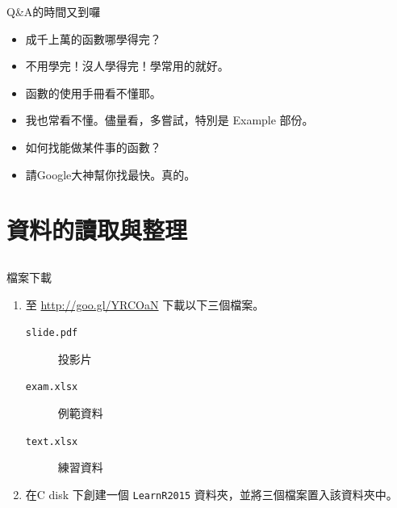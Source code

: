 \documentclass[12pt, aspectratio=43]{beamer}
\begin{document}
\begin{frame}[fragile]{Q\&A的時間又到囉}
\begin{itemize}
\item[Q] 成千上萬的函數哪學得完？
\item[A] 不用學完！沒人學得完！學常用的就好。
\end{itemize}
\begin{itemize}
\item[Q] 函數的使用手冊看不懂耶。
\item[A] 我也常看不懂。儘量看，多嘗試，特別是 Example 部份。
\end{itemize}
\begin{itemize}
\item[Q] 如何找能做某件事的函數？
\item[A] 請Google大神幫你找最快。真的。
\end{itemize}
\end{frame}


\section{資料的讀取與整理}\subsection{}


\begin{frame}[fragile]{檔案下載}
\begin{enumerate}
\item 至 \url{http://goo.gl/YRCOaN} 下載以下三個檔案。
\begin{description}
\item [\texttt{slide.pdf}]投影片
\item [\texttt{exam.xlsx}]例範資料
\item [\texttt{text.xlsx}]練習資料
\end{description}

\item 在C disk 下創建一個 \verb+LearnR2015+ 資料夾，並將三個檔案置入該資料夾中。
\end{enumerate}
\end{frame}
\end{document}
